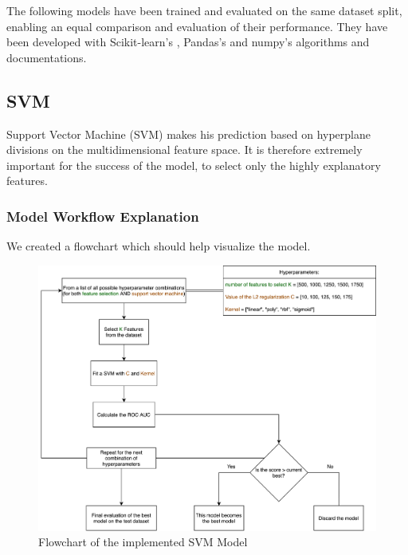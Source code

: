 \documentclass{article}
\begin{document}
The following models have been trained and evaluated on the same dataset split, enabling an equal comparison and evaluation of their performance. They have been developed with Scikit-learn's \citep{scikit-learn}, Pandas's \citep{pandas} and numpy's \citep{numpy} algorithms and documentations. 

\subsection{SVM}

Support Vector Machine (SVM) makes his prediction based on hyperplane divisions on the multidimensional feature space. It is therefore extremely important for the success of the model, to select only the highly explanatory features. 

\subsubsection{Model Workflow Explanation}

We created a flowchart which should help visualize the model.

\begin{figure}[h]
	\centering
	\includegraphics[width=1.0\textwidth]{FlowChart.png}
	 \vspace{0em}
	\caption{Flowchart of the implemented SVM Model}
\end{figure}
\end{document}
